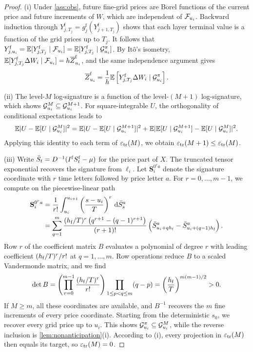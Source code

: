 \begin{proof}

(i) Under \cref{ass:obs}, future fine-grid prices are Borel functions of the current price and future increments of $W$, which are independent of $\mathcal{F}_{u_i}$. Backward induction through $Y^{\mathrm f}_{j,T_j}=g^{\mathrm f}_j(Y^{\mathrm f}_{j+1,T_j})$ shows that each layer terminal value is a function of the grid prices up to $T_j$. It follows that $Y^{\mathrm f}_{j,u_i}=\mathbb{E}[Y^{\mathrm f}_{j,T_j}\mid\mathcal{F}_{u_i}]=\mathbb{E}[Y^{\mathrm f}_{j,T_j}\mid\mathcal{G}^{\pi}_{u_i}]$. By It\^o's isometry, $\mathbb{E}[Y^{\mathrm f}_{j,T_j}\Delta W_i\mid\mathcal{F}_{u_i}]=h\overline Z^{\mathrm f}_{u_i}$, and the same independence argument gives
\begin{equation}\label{eq:information-hedge}
\overline Z^{\mathrm f}_{u_i}=\frac1h\mathbb{E}\left[Y^{\mathrm f}_{j,T_j}\Delta W_i\mid\mathcal{G}^{\pi}_{u_i}\right].
\end{equation}

(ii) The level-$M$ log-signature is a function of the level-$(M+1)$ log-signature, which shows $\mathcal{G}^{M}_{u_i}\subseteq\mathcal{G}^{M+1}_{u_i}$. For square-integrable $U$, the orthogonality of conditional expectations leads to
\[
\mathbb{E}\lvert U-\mathbb{E}[U\mid\mathcal{G}^{M}_{u_i}]\rvert^2=\mathbb{E}\lvert U-\mathbb{E}[U\mid\mathcal{G}^{M+1}_{u_i}]\rvert^2+\mathbb{E}\lvert \mathbb{E}[U\mid\mathcal{G}^{M+1}_{u_i}]-\mathbb{E}[U\mid\mathcal{G}^{M}_{u_i}]\rvert^2 .
\]
Applying this identity to each term of $\varepsilon_{\mathrm{tr}}(M)$, we obtain $\varepsilon_{\mathrm{tr}}(M+1)\le\varepsilon_{\mathrm{tr}}(M)$.

(iii) Write $\bar S_t=D^{-1}(I^{\mathrm f} S^{\mathrm f}_t-\mu)$ for the price part of $X$. The truncated tensor exponential recovers the signature from $\ell_i$. Let $\mathbf S_i^{0^ra}$ denote the signature coordinate with $r$ time letters followed by price letter $a$. For $r=0,\dots,m-1$, we compute on the piecewise-linear path
\begin{align*}
\mathbf S_i^{0^ra}&=\frac1{r!}\int_{u_i}^{u_{i+1}}\left(\frac{s-u_i}{T}\right)^r\,\mathrm{d}\bar S^a_s\\
&=\sum_{q=1}^m\frac{(h_{\mathrm f}/T)^r\left(q^{r+1}-(q-1)^{r+1}\right)}{(r+1)!}\left(\bar S^a_{u_i+qh_{\mathrm f}}-\bar S^a_{u_i+(q-1)h_{\mathrm f}}\right).
\end{align*}
Row $r$ of the coefficient matrix $B$ evaluates a polynomial of degree $r$ with leading coefficient $(h_{\mathrm f}/T)^r/r!$ at $q=1,\dots,m$. Row operations reduce $B$ to a scaled Vandermonde matrix, and we find
\[
\det B=\left(\prod_{r=0}^{m-1}\frac{(h_{\mathrm f}/T)^r}{r!}\right)\prod_{1\le p<q\le m}(q-p)=\left(\frac{h_{\mathrm f}}{T}\right)^{m(m-1)/2}>0 .
\]
If $M\ge m$, all these coordinates are available, and $B^{-1}$ recovers the $m$ fine increments of every price coordinate. Starting from the deterministic $s_0$, we recover every grid price up to $u_i$. This shows $\mathcal{G}^{\pi}_{u_i}\subseteq\mathcal{G}^{M}_{u_i}$, while the reverse inclusion is \cref{lem:nonanticipation}(i). According to (i), every projection in $\varepsilon_{\mathrm{tr}}(M)$ then equals its target, so $\varepsilon_{\mathrm{tr}}(M)=0$.


\end{proof}
